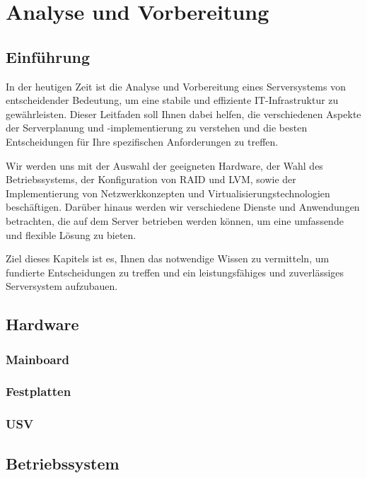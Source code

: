 \chapter{Analyse und Vorbereitung}

\section{Einführung}
In der heutigen Zeit ist die Analyse und Vorbereitung eines Serversystems von entscheidender Bedeutung, um eine stabile und effiziente IT-Infrastruktur zu gewährleisten. Dieser Leitfaden soll Ihnen dabei helfen, die verschiedenen Aspekte der Serverplanung und -implementierung zu verstehen und die besten Entscheidungen für Ihre spezifischen Anforderungen zu treffen.

Wir werden uns mit der Auswahl der geeigneten Hardware, der Wahl des Betriebssystems, der Konfiguration von RAID und LVM, sowie der Implementierung von Netzwerkkonzepten und Virtualisierungstechnologien beschäftigen. Darüber hinaus werden wir verschiedene Dienste und Anwendungen betrachten, die auf dem Server betrieben werden können, um eine umfassende und flexible Lösung zu bieten.

Ziel dieses Kapitels ist es, Ihnen das notwendige Wissen zu vermitteln, um fundierte Entscheidungen zu treffen und ein leistungsfähiges und zuverlässiges Serversystem aufzubauen.

\section{Hardware}
\subsection{Mainboard}

\subsection{Festplatten}

\subsection{USV}

\section{Betriebssystem}
